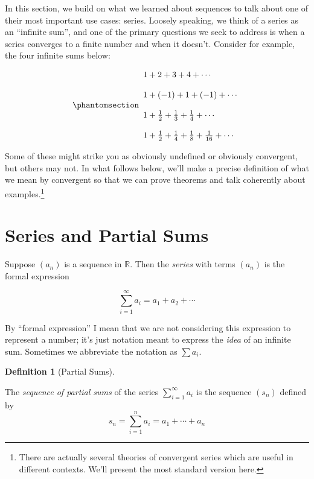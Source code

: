 \documentclass[
  letterpaper,
  DIV=11,
  numbers=noendperiod]{scrreprt}
\theoremstyle{plain}
\theoremstyle{definition}
\theoremstyle{plain}
\theoremstyle{plain}
\theoremstyle{definition}
\theoremstyle{definition}
\newtheorem{definition}{Definition}[chapter]
\theoremstyle{remark}
\begin{document}
In this section, we build on what we learned about sequences to talk
about one of their most important use cases: series. Loosely speaking,
we think of a series as an ``infinite sum'', and one of the primary
questions we seek to address is when a series converges to a finite
number and when it doesn't. Consider for example, the four infinite sums
below:

\begin{equation}\phantomsection\label{eq-first-examples}{\begin{array}{l}
1+2+3+4+\cdots \\~\\
1+(-1)+1+(-1)+\cdots \\~\\
1+\frac{1}{2}+\frac{1}{3}+\frac{1}{4}+\cdots \\~\\
1+\frac{1}{2}+\frac{1}{4}+\frac{1}{8}+\frac{1}{16}+\cdots
\end{array}}\end{equation}

Some of these might strike you as obviously undefined or obviously
convergent, but others may not. In what follows below, we'll make a
precise definition of what we mean by convergent so that we can prove
theorems and talk coherently about examples.\footnote{There are actually
  several theories of convergent series which are useful in different
  contexts. We'll present the most standard version here.}

\section{Series and Partial Sums}\label{series-and-partial-sums}

Suppose \((a_n)\) is a sequence in \(\mathbb{R}\). Then the
\emph{series} with terms \((a_n)\) is the formal expression

\[\sum_{i=1}^\infty a_i=a_1+a_2+\cdots\]

By ``formal expression'' I mean that we are not considering this
expression to represent a number; it's just notation meant to express
the \emph{idea} of an infinite sum. Sometimes we abbreviate the notation
as \(\sum a_i\).

\begin{definition}[Partial
Sums]\protect\hypertarget{def-partial-sum}{}\label{def-partial-sum}

The \emph{sequence of partial sums} of the series
\(\displaystyle\sum_{i=1}^\infty a_i\) is the sequence \((s_n)\) defined
by \[ s_n=\sum_{i=1}^n a_i = a_1+\cdots+a_n \]

\end{definition}
\end{document}
